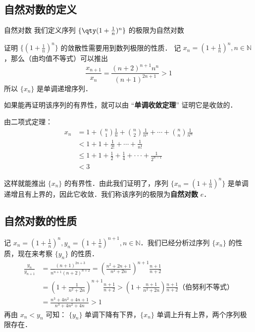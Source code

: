 

\subsection{自然对数的定义}
\begin{definition}{自然对数}
我们定义序列 $\{\qty(1+\frac{1}{n})^n\}$ 的极限为自然对数
\end{definition}
证明 $\{(1+\frac{1}{n})^n\}$ 的敛散性需要用到数列极限的性质．
记 $x_n=(1+\frac{1}{n})^n, n\in \mathbb{N}$，那么（由均值不等式）可以推出
\begin{equation}
  \frac{x_{n+1}}{x_n}=\frac{(n+2)^{n+1}n^{n}}{(n+1)^{2n+1}}>1
\end{equation}
所以 $\{x_n\}$ 是单调递增序列．

  如果能再证明该序列的有界性，就可以由 “\textbf{单调收敛定理}” 证明它是收敛的．

由二项式定理：
\begin{equation}\label{exp_eq1}
\begin{aligned}
  x_n&=1+{n\choose 1}\frac{1}{n}+{n\choose 2}\frac{1}{n^2}+\cdots+{n\choose n}\frac{1}{n^n}\\
  &<1+1+\frac{1}{2!}+\cdots+\frac{1}{n!}\\
  &\leq1+1+\frac{1}{2}+\frac{1}{4}+\cdot\cdot\cdot+\frac{1}{2^{n-1}}\\
  &<3
\end{aligned}
\end{equation}

这样就能推出 $\{x_n\}$ 的有界性．由此我们证明了，序列 $\{x_n=(1+\frac{1}{n})^n\}$ 是单调递增且有上界的，因此它收敛．我们称该序列的极限为\textbf{自然对数} $e$．

  
\subsection{自然对数的性质}
  记 $x_n=(1+\frac{1}{n})^n,y_n=(1+\frac{1}{n})^{n+1}, n\in \mathbb{N}$．我们已经分析过序列 $\{x_n\}$ 的性质，现在来考察 $\{y_n\}$ 的性质．
\begin{equation}
  \begin{aligned}
  \frac{y_n}{y_{n+1}}&=\frac{(n+1)^{2n+3}}{n^{n+1}(n+2)^{n+2}}=\left(\frac{n^2+2n+1}{n^2+2n}\right)^{n+1}\frac{n+1}{n+2}\\
  &=(1+\frac{1}{n^2+2n})^{n+1}\frac{n+1}{n+2}>\left(1+\frac{n+1}{n^2+2n}\right)\frac{n+1}{n+2} \text{（伯努利不等式）}\\
  &=\frac{n^3+4n^2+4n+1}{n^3+4n^2+4n}>1
  \end{aligned}
\end{equation}
  再由 $x_n<y_n$ 可知： $\{y_n\}$ 单调下降有下界，$\{x_n\}$ 单调上升有上界，两个序列极限存在．

